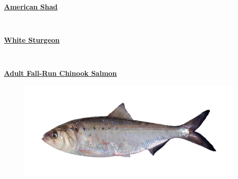 \documentclass[
]{book}
\begin{document}
\begin{panel-grid}

\begin{columns-nocenter}

\begin{column800}

\textbf{\href{http://calfish.ucdavis.edu/species/?uid=3\&ds=698}{American Shad}}

\end{column800}

\begin{column40}

~

\end{column40}

\begin{column800}

\textbf{\href{http://calfish.ucdavis.edu/species/?uid=182\&ds=698}{White Sturgeon}}

\end{column800}

\begin{column40}

~

\end{column40}

\begin{column800}

\textbf{\href{http://calfish.ucdavis.edu/species/?uid=26\&ds=698}{Adult Fall-Run Chinook Salmon}}

\end{column800}

\end{columns-nocenter}

\begin{columns-nocenter}

\begin{column800}

\begin{figure}

{\centering \includegraphics[width=29.17in]{figures/american_shad} 

}
\end{figure}
\end{column800}
\end{columns-nocenter}
\end{panel-grid}
\end{document}
